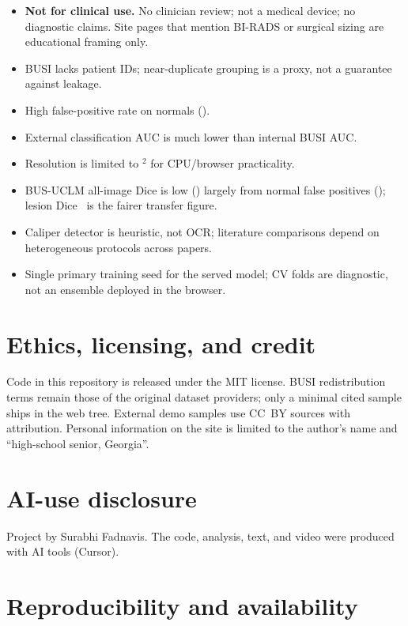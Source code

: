 \documentclass[11pt,a4paper]{article}
\begin{document}
\begin{itemize}[leftmargin=*,itemsep=0.35em]
\item \textbf{Not for clinical use.} No clinician review; not a medical device; no diagnostic
  claims. Site pages that mention BI-RADS or surgical sizing are educational framing only.
\item BUSI lacks patient IDs; near-duplicate grouping is a proxy, not a guarantee against
  leakage.
\item High false-positive rate on normals (\MetricNormalFP).
\item External classification AUC is much lower than internal BUSI AUC.
\item Resolution is limited to \MetricImgSize$^2$ for CPU/browser practicality.
\item BUS-UCLM all-image Dice is low (\MetricBusuclmDice) largely from normal false positives
  (\MetricBusuclmNormalFP); lesion Dice \MetricBusuclmLesionDice\ is the fairer transfer figure.
\item Caliper detector is heuristic, not OCR; literature comparisons depend on heterogeneous
  protocols across papers.
\item Single primary training seed for the served model; CV folds are diagnostic, not an
  ensemble deployed in the browser.
\end{itemize}

\section{Ethics, licensing, and credit}

Code in this repository is released under the MIT license. BUSI redistribution terms remain
those of the original dataset providers; only a minimal cited sample ships in the web tree.
External demo samples use CC~BY sources with attribution. Personal information on the site is
limited to the author's name and ``high-school senior, Georgia''.

\section{AI-use disclosure}

Project by Surabhi Fadnavis. The code, analysis, text, and video were produced with AI tools (Cursor).

\section{Reproducibility and availability}
\end{document}
